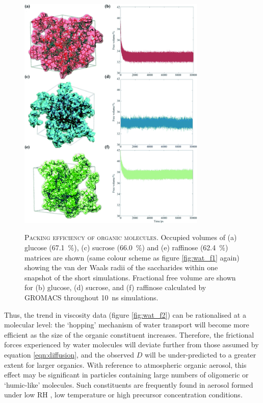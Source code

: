 \begin{figure}
    \centering
    \caption[Packing efficiency of organic molecules]{\textsc{Packing efficiency of organic molecules}. Occupied volumes of (a) glucose (\SI{67.1}{\percent}), (c) sucrose (\SI{66.0}{\percent}) and (e) raffinose (\SI{62.4}{\percent}) matrices are shown (same colour scheme as figure \ref{fig:wat_f1} again) showing the van der Waals radii of the saccharides within one snapshot of the short simulations. Fractional free volume are shown for (b) glucose, (d) sucrose, and (f) raffinose calculated by GROMACS throughout \SI{10}{\nano\second} simulations.}
    \includegraphics[width=0.8\textwidth]{chapters/water_hopping/figures/f5.png}
    \label{fig:wat_packing_eff}
\end{figure}

Thus, the trend in viscosity data (figure \ref{fig:wat_f2}) can be rationalised at a molecular level: the `hopping’ mechanism of water transport will become more efficient as the size of the organic constituent increases. Therefore, the frictional forces experienced by water molecules will deviate further from those assumed by equation \ref{eqn:diffusion}, and the observed $D$ will be under-predicted to a greater extent for larger organics. With reference to atmospheric organic aerosol, this effect may be significant in particles containing large numbers of oligomeric or `humic-like’ molecules. Such constituents are frequently found in aerosol formed under low RH \cite{Jia2018}, low temperature \cite{huang2018alpha} or high precursor concentration \cite{Kourtchev2016} conditions.

